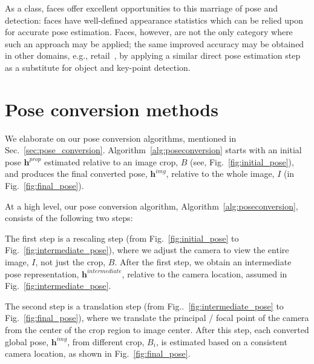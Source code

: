 \documentclass[final]{cvpr}
\begin{document}
As a class, faces offer excellent opportunities to this marriage of pose and detection: faces have well-defined appearance statistics which can be relied upon for accurate pose estimation. Faces, however, are not the only category where such an approach may be applied; the same improved accuracy may be obtained in other domains, e.g., retail~\cite{goldman2019precise}, by applying a similar direct pose estimation step as a substitute for object and key-point detection.  


{\small


}

\appendix

\section{Pose conversion methods}\label{sec:append:poseconvert}
We elaborate on our pose conversion algorithms, mentioned in Sec.~\ref{sec:pose_conversion}. Algorithm~\ref{alg:poseconversion} starts with an initial pose $\mathbf{h}^{prop}$ estimated relative to an image crop, $B$ (see, Fig.~\ref{fig:initial_pose}), and produces the final converted pose, $\mathbf{h}^{img}$, relative to the whole image, $I$ (in Fig.~\ref{fig:final_pose}).

At a high level, our pose conversion algorithm, Algorithm~\ref{alg:poseconversion}, consists of the following two steps:

The first step is a rescaling step (from Fig.~\ref{fig:initial_pose} to Fig.~\ref{fig:intermediate_pose}), where we adjust the camera to view the entire image, $I$, not just the crop, $B$.
After the first step, we obtain an intermediate pose representation, $\mathbf{h}^{intermediate}$, relative to the camera location, assumed in Fig.~\ref{fig:intermediate_pose}. 

The second step is a translation step (from Fig..~\ref{fig:intermediate_pose} to Fig.~\ref{fig:final_pose}), where we translate the principal / focal point of the camera from the center of the crop region to image center. After this step, each converted global pose, $\mathbf{h}^{img}$, from different crop, $B_i$, is estimated based on a consistent camera location, as shown in Fig.~\ref{fig:final_pose}. 
\end{document}
